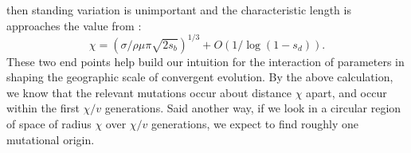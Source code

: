 \documentclass{article}
\begin{document}
then standing variation is unimportant and the characteristic length is approaches the value from \citet{ralphcoop2010}:
\begin{equation} \label{eqn:chi_new}
\chi = ( \sigma / \rho \mu \pi \sqrt{2 s_b} )^{1/3} + O(1/\log(1-s_d)).
\end{equation}
These two end points help build our intuition for the interaction of
parameters in shaping the geographic scale of convergent evolution.
By the above calculation, we know that the relevant mutations occur about distance $\chi$ apart, 
 and occur within the first $\chi/v$ generations.
 Said another way, if we look in a circular region of space of radius $\chi$ over $\chi/v$ generations,
 we expect to find roughly one mutational origin.


\end{document}
